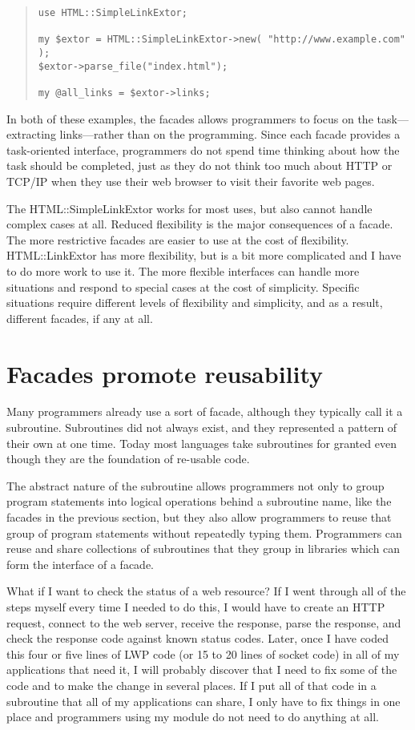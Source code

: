 \begin{quote}
\begin{verbatim}
use HTML::SimpleLinkExtor;

my $extor = HTML::SimpleLinkExtor->new( "http://www.example.com" );
$extor->parse_file("index.html");

my @all_links = $extor->links;
\end{verbatim}
\end{quote}

In both of these examples, the facades allows programmers to focus on
the task---extracting links---rather than on the programming.  Since
each facade provides a task-oriented interface, programmers do not spend time
thinking about how the task should be completed, just as they do not
think too much about HTTP or TCP/IP when they use their web browser to visit
their favorite web pages.

The HTML::SimpleLinkExtor works for most uses, but also cannot handle
complex cases at all.  Reduced flexibility is the major  consequences
of a facade. The more restrictive facades are easier to use at
the cost of flexibility. HTML::LinkExtor has more flexibility, but
is a bit more complicated and I have to do more work to use it. The
more flexible interfaces can handle more situations and respond to
special cases at the cost of simplicity.  Specific situations require
different levels of flexibility and simplicity, and as a result,
different facades, if any at all.


\section{Facades promote reusability}

Many programmers already use a sort of facade, although they typically call
it a subroutine. Subroutines did not always exist, and they represented
a pattern of their own at one time.  Today most languages take subroutines
for granted even though they are the foundation of re-usable code.

The abstract nature of the subroutine allows programmers not only to
group program statements into logical operations behind a subroutine
name, like the facades in the previous section, but they also allow
programmers to reuse that group of program statements without
repeatedly typing them.  Programmers can reuse and share collections
of subroutines that they group in libraries which can form the
interface of a facade.

What if I want to check the status of a web resource? If I went
through all of the steps myself every time I needed to do this, I
would have to create an HTTP request, connect to the web server,
receive the response, parse the response, and check the response code
against known status codes.  Later, once I have coded this four or
five lines of LWP code (or 15 to 20 lines of socket code) in all of my
applications that need it, I will probably discover that I need to fix
some of the code and to make the change in several places.  If I
put all of that code in a subroutine that all of my applications can
share, I only have to fix things in one place and programmers using
my module do not need to do anything at all.

